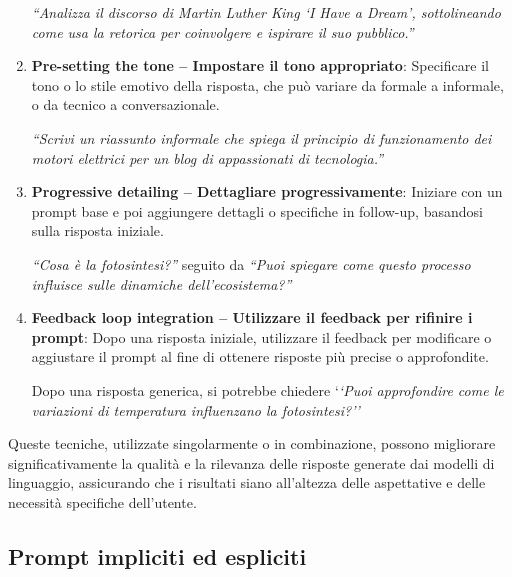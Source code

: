 \begin{enumerate}
            \textit{``Analizza il discorso di Martin Luther King `I Have a Dream', sottolineando come usa la retorica per coinvolgere e ispirare il suo pubblico.''}
            
            \item \textbf{Pre-setting the tone -- Impostare il tono appropriato}: Specificare il tono o lo stile emotivo della risposta, che può variare da formale a informale, o da tecnico a conversazionale.
            
            \textit{``Scrivi un riassunto informale che spiega il principio di funzionamento dei motori elettrici per un blog di appassionati di tecnologia.''}
            
            \item \textbf{Progressive detailing -- Dettagliare progressivamente}: Iniziare con un prompt base e poi aggiungere dettagli o specifiche in follow-up, basandosi sulla risposta iniziale.
            
            \textit{``Cosa è la fotosintesi?''} seguito da \textit{``Puoi spiegare come questo processo influisce sulle dinamiche dell'ecosistema?''}
            
            \item \textbf{Feedback loop integration -- Utilizzare il feedback per rifinire i prompt}: Dopo una risposta iniziale, utilizzare il feedback per modificare o aggiustare il prompt al fine di ottenere risposte più precise o approfondite.
            
            Dopo una risposta generica, si potrebbe chiedere `\textit{`Puoi approfondire come le variazioni di temperatura influenzano la fotosintesi?''}
        \end{enumerate}
        
        Queste tecniche, utilizzate singolarmente o in combinazione, possono migliorare significativamente la qualità e la rilevanza delle risposte generate dai modelli di linguaggio, assicurando che i risultati siano all'altezza delle aspettative e delle necessità specifiche dell'utente.
    \subsection{Prompt impliciti ed espliciti}
        
